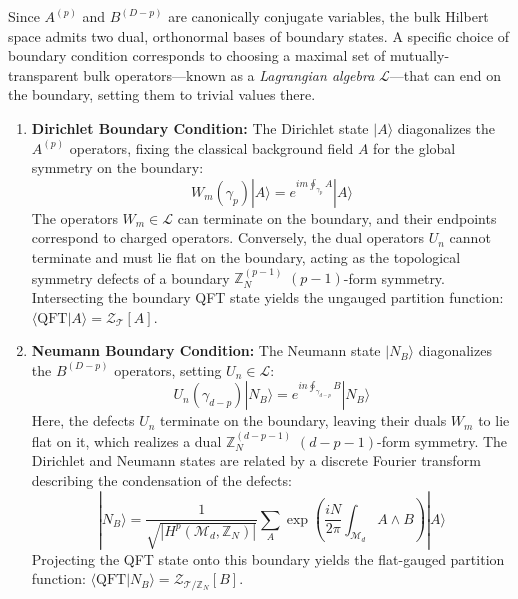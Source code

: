\documentclass[aps,preprint,nofootinbib,preprintnumbers,eqsecnum,superscriptaddress]{revtex4}
\numberwithin{equation}{section}
\begin{document}
Since $A^{(p)}$ and $B^{(D-p)}$ are canonically conjugate variables, the bulk Hilbert space admits two dual, orthonormal bases of boundary states. A specific choice of boundary condition corresponds to choosing a maximal set of mutually-transparent bulk operators—known as a \textit{Lagrangian algebra} $\mathcal{L}$—that can end on the boundary, setting them to trivial values there.
\begin{enumerate}[\itshape i)]
    \item \textbf{Dirichlet Boundary Condition:} The Dirichlet state $|A\rangle$ diagonalizes the $A^{(p)}$ operators, fixing the classical background field $A$ for the global symmetry on the boundary:
    \begin{equation}
        W_m(\gamma_p)|A\rangle = e^{im \oint_{\gamma_p} A} |A\rangle
    \end{equation}
    The operators $W_m \in \mathcal{L}$ can terminate on the boundary, and their endpoints correspond to charged operators. Conversely, the dual operators $U_n$ cannot terminate and must lie flat on the boundary, acting as the topological symmetry defects of a boundary $\mathbb{Z}_N^{(p-1)}$ $(p-1)$-form symmetry. Intersecting the boundary QFT state yields the ungauged partition function: $\langle \text{QFT}|A\rangle = \mathcal{Z}_{\mathcal{T}}[A]$.
    
    \item \textbf{Neumann Boundary Condition:} The Neumann state $|N_B\rangle$ diagonalizes the $B^{(D-p)}$ operators, setting $U_n \in \mathcal{L}$:
    \begin{equation}
        U_n(\gamma_{d-p})|N_B\rangle = e^{in \oint_{\gamma_{d-p}} B} |N_B\rangle
    \end{equation}
    Here, the defects $U_n$ terminate on the boundary, leaving their duals $W_m$ to lie flat on it, which realizes a dual $\mathbb{Z}_N^{(d-p-1)}$ $(d-p-1)$-form symmetry. The Dirichlet and Neumann states are related by a discrete Fourier transform describing the condensation of the defects:
    \begin{equation}
        |N_B\rangle = \frac{1}{\sqrt{|H^p(\mathcal{M}_d, \mathbb{Z}_N)|}} \sum_{A} \exp\left(\frac{iN}{2\pi} \int_{\mathcal{M}_d} A \wedge B\right) |A\rangle
    \end{equation}
    Projecting the QFT state onto this boundary yields the flat-gauged partition function: $\langle \text{QFT}|N_B\rangle = \mathcal{Z}_{\mathcal{T}/\mathbb{Z}_N}[B]$.
\end{enumerate}
\end{document}
